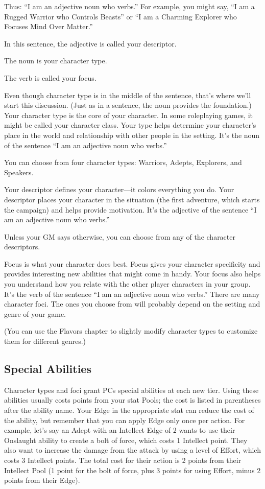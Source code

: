 \begin{multicols}{2}
Thus: “I am an adjective noun who verbs.” For example, you might say, “I am a Rugged Warrior who Controls Beasts” or “I am a Charming Explorer who Focuses Mind Over Matter.”

In this sentence, the adjective is called your descriptor.

The noun is your character type.

The verb is called your focus.

Even though character type is in the middle of the sentence, that’s where we’ll start this discussion. (Just as in a sentence, the noun provides the foundation.)
Your character type is the core of your character. In some roleplaying games, it might be called your character class. Your type helps determine your character’s place in the world and relationship with other people in the setting. It’s the noun of the sentence “I am an adjective noun who verbs.”

You can choose from four character types: Warriors, Adepts, Explorers, and Speakers.

Your descriptor defines your character—it colors everything you do. Your descriptor places your character in the situation (the first adventure, which starts the campaign) and helps provide motivation. It’s the adjective of the sentence “I am an adjective noun who verbs.”

Unless your GM says otherwise, you can choose from any of the character descriptors.

Focus is what your character does best. Focus gives your character specificity and provides interesting new abilities that might come in handy. Your focus also helps you understand how you relate with the other player characters in your group. It’s the verb of the sentence “I am an adjective noun who verbs.”
There are many character foci. The ones you choose from will probably depend on the setting and genre of your game.

(You can use the Flavors chapter to slightly modify character types to customize them for different genres.)

\subsection{Special Abilities}

Character types and foci grant PCs special abilities at each new tier. Using these abilities usually costs points from your stat Pools; the cost is listed in parentheses after the ability name. Your Edge in the appropriate stat can reduce the cost of the ability, but remember that you can apply Edge only once per action. For example, let’s say an Adept with an Intellect Edge of 2 wants to use their Onslaught ability to create a bolt of force, which costs 1 Intellect point. They also want to increase the damage from the attack by using a level of Effort, which costs 3 Intellect points. The total cost for their action is 2 points from their Intellect Pool (1 point for the bolt of force, plus 3 points for using Effort, minus 2 points from their Edge).


\end{multicols}
